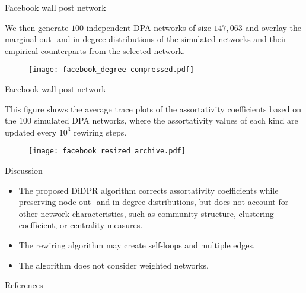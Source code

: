 \documentclass[xcolor=dvipsnames, compress, 10pt]{beamer}
\theoremstyle{remark}
\begin{document}

\begin{frame}{Facebook wall post network}

We then generate $100$ independent DPA networks of size $147,063$ and overlay
the marginal out- and in-degree distributions of the simulated networks and
their empirical counterparts from the selected network.


\begin{figure}
	\centering
	\texttt{[image: facebook\_degree-compressed.pdf]}
\end{figure}
	
\end{frame}


\begin{frame}{Facebook wall post network}

This figure shows the average trace plots of the assortativity coefficients
based on the $100$ simulated DPA networks, where the assortativity values of
each kind are updated every $10^3$ rewiring steps. 


\begin{figure}
	\centering
	\texttt{[image: facebook\_resized\_archive.pdf]}
\end{figure}
	
\end{frame}


\appendix

\begin{frame}[plain]{Discussion}

\begin{itemize}
	\item The proposed DiDPR algorithm
	corrects assortativity coefficients while preserving node out- and in-degree distributions, but does not account for other network characteristics, such as
	community structure, clustering coefficient, or centrality measures.
	\item The rewiring algorithm may create self-loops
	and multiple edges.
	\item The algorithm does not consider weighted networks.
\end{itemize}
	
\end{frame}


\begin{frame}[plain]{References}
	\fontsize{7}{8}\selectfont
	\nocite{Wang2022generating}
	\nocite{Rpkg:wdnet}
	
	
\end{frame}

\end{document}
